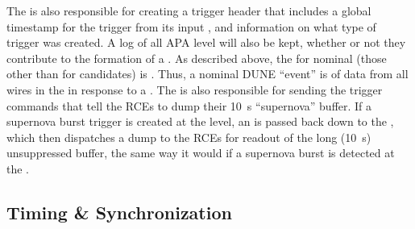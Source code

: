 	
The  is also responsible for creating a trigger header that
includes a global timestamp for the trigger from its input
, and information on what type of trigger was
created. 
A log of all APA level  will also be kept,
whether or not they contribute to the formation of a
. 
As described above, the  for nominal
 (those other than for  candidates) is
\readout.
Thus, a nominal DUNE ``event'' is \readout of data from all wires
in the   in response to a 
. 
The  is also responsible for sending the trigger commands
that tell the RCEs to dump their \SI{10}{\s} ``supernova'' buffer. 
If a supernova burst trigger is created at the  level, an
 is passed back down to the , which
then dispatches a dump  to the RCEs for readout of
the long (\SI{10}{\s}) unsuppressed buffer, the same way it would if a
supernova burst is detected at the .


	


%

%
%
%

\subsection{Timing \& Synchronization}
\label{sec:fdsp-daq-timing}


